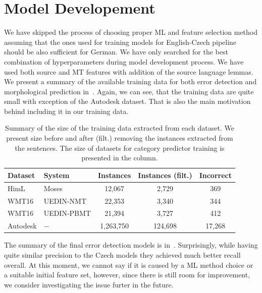 \section{Model Developement}

We have skipped the process of choosing proper ML and feature selection method
assuming that the ones used for training models for English-Czech pipeline should
be also sufficient for German. We have only searched for the best combination
of hyperparameters during model development process. We have used both source
and MT features with addition of the source language lemmas. We present a summary
of the available training data for both error detection and morphological prediction in~.
Again, we can see, that the training data are quite small with exception of the Autodesk
dataset. That is also the main motivation behind including it in our training data.

\begin{table}[t]
\centering
\small

\begin{tabular}{ll|ccc}
Dataset  &  System &  \hash{} Instances  &  \hash{} Instances (filt.)  &  \hash{} Incorrect  \\
\hline
HimL  &  Moses  & 12,067  &  2,729  &  369  \\
WMT16  &  UEDIN-NMT  &  22,353  &  3,340  &  344  \\
WMT16  &  UEDIN-PBMT  &  21,394  &   3,727  &  412  \\
Autodesk  &  $-$  &  1,263,750  &  124,698  &  17,268  \\
\end{tabular}
\caption[Summary of the extracted German training data]{
    Summary of the size of the training data extracted from each dataset. We present
size before and after (filt.) removing the instances extracted from the  sentences.
The size of datasets for category predictor training is presented in the  column.
}
\label{wf-cat-data-sum}
\end{table}

The summary of the final error detection models is in~. Surprisingly,
while having quite similar precision to the Czech models they achieved much better
recall overall. At this moment, we cannot say if it is caused by a ML method choice or a suitable
initial feature set, however, since there is still room for improvement, we consider investigating
the issue furter in the future.

